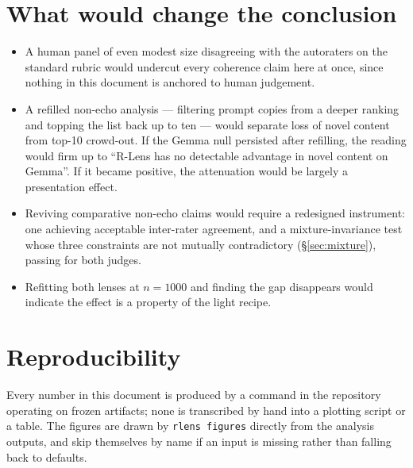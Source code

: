 \documentclass[11pt]{article}
\begin{document}
\section{What would change the conclusion}

\begin{itemize}[leftmargin=*]
\item A human panel of even modest size disagreeing with the autoraters on the
      standard rubric would undercut every coherence claim here at once, since
      nothing in this document is anchored to human judgement.
\item A refilled non-echo analysis --- filtering prompt copies from a deeper
      ranking and topping the list back up to ten --- would separate loss of
      novel content from top-10 crowd-out. If the Gemma null persisted after
      refilling, the reading would firm up to ``R-Lens has no detectable
      advantage in novel content on Gemma''. If it became positive, the
      attenuation would be largely a presentation effect.
\item Reviving comparative non-echo claims would require a redesigned
      instrument: one achieving acceptable inter-rater agreement, and a
      mixture-invariance test whose three constraints are not mutually
      contradictory (\S\ref{sec:mixture}), passing for both judges.
\item Refitting both lenses at $n = 1000$ and finding the gap disappears would
      indicate the effect is a property of the light recipe.
\end{itemize}

\section{Reproducibility}
\label{sec:repro}

Every number in this document is produced by a command in the repository
operating on frozen artifacts; none is transcribed by hand into a plotting
script or a table. The figures are drawn by \texttt{rlens figures} directly from
the analysis outputs, and skip themselves by name if an input is missing rather
than falling back to defaults.
\end{document}
